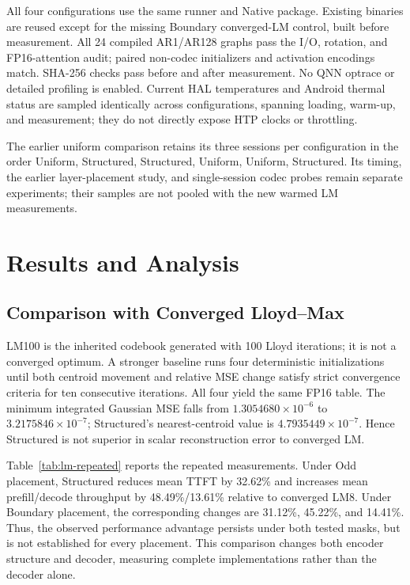 \documentclass[conference,a4paper,10pt]{IEEEtran}
\begin{document}
All four configurations use the same runner and Native package. Existing binaries are reused except for the missing Boundary converged-LM control, built before measurement. All 24 compiled AR1/AR128 graphs pass the I/O, rotation, and FP16-attention audit; paired non-codec initializers and activation encodings match. SHA-256 checks pass before and after measurement. No QNN optrace or detailed profiling is enabled. Current HAL temperatures and Android thermal status are sampled identically across configurations, spanning loading, warm-up, and measurement; they do not directly expose HTP clocks or throttling.

The earlier uniform comparison retains its three sessions per configuration in the order Uniform, Structured, Structured, Uniform, Uniform, Structured. Its timing, the earlier layer-placement study, and single-session codec probes remain separate experiments; their samples are not pooled with the new warmed LM measurements.

\section{Results and Analysis}
\subsection{Comparison with Converged Lloyd--Max}
LM100 is the inherited codebook generated with 100 Lloyd iterations; it is not a converged optimum. A stronger baseline runs four deterministic initializations until both centroid movement and relative MSE change satisfy strict convergence criteria for ten consecutive iterations. All four yield the same FP16 table. The minimum integrated Gaussian MSE falls from $1.3054680\!\times\!10^{-6}$ to $3.2175846\!\times\!10^{-7}$; Structured's nearest-centroid value is $4.7935449\!\times\!10^{-7}$. Hence Structured is not superior in scalar reconstruction error to converged LM.



Table~\ref{tab:lm-repeated} reports the repeated measurements. Under Odd placement, Structured reduces mean TTFT by 32.62\% and increases mean prefill/decode throughput by 48.49\%/13.61\% relative to converged LM8. Under Boundary placement, the corresponding changes are 31.12\%, 45.22\%, and 14.41\%. Thus, the observed performance advantage persists under both tested masks, but is not established for every placement. This comparison changes both encoder structure and decoder, measuring complete implementations rather than the decoder alone.
\end{document}
